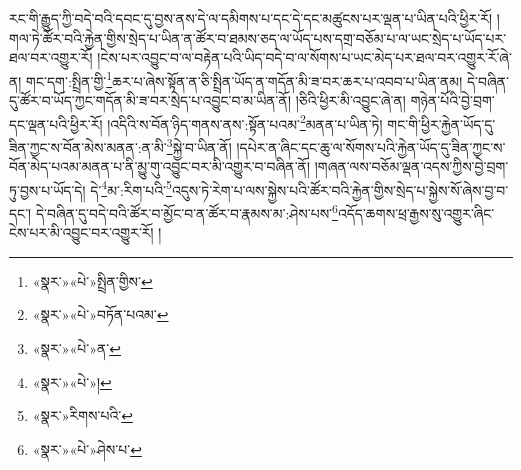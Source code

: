 རང་གི་རྒྱུད་ཀྱི་བདེ་བའི་དབང་དུ་བྱས་ནས་དེ་ལ་དམིགས་པ་དང་དེ་དང་མཚུངས་པར་ལྡན་པ་ཡིན་པའི་ཕྱིར་རོ། །གལ་ཏེ་ཚོར་བའི་རྐྱེན་གྱིས་སྲེད་པ་ཡིན་ན་ཚོར་བ་ཐམས་ཅད་ལ་ཡོད་པས་དགྲ་བཅོམ་པ་ལ་ཡང་སྲེད་པ་ཡོད་པར་ཐལ་བར་འགྱུར་རོ། །ངེས་པར་འབྱུང་བ་ལ་བརྟེན་པའི་ཡིད་བདེ་བ་ལ་སོགས་པ་ཡང་མེད་པར་ཐལ་བར་འགྱུར་རོ་ཞེ་ན། གང་དག་:སྤྲིན་གྱི་\footnote{«སྣར་»«པེ་»སྤྲིན་གྱིས་}ཆར་པ་ཞེས་སྟོན་ན་ཅི་སྤྲིན་ཡོད་ན་གདོན་མི་ཟ་བར་ཆར་པ་འབབ་པ་ཡིན་ནམ། དེ་བཞིན་དུ་ཚོར་བ་ཡོད་ཀྱང་གདོན་མི་ཟ་བར་སྲེད་པ་འབྱུང་བ་མ་ཡིན་ནོ། །ཅིའི་ཕྱིར་མི་འབྱུང་ཞེ་ན། གཉེན་པོའི་བྱེ་བྲག་དང་ལྡན་པའི་ཕྱིར་རོ། །འདིའི་ས་བོན་ཉིད་གནས་ནས་:སྟོན་པའམ་\footnote{«སྣར་»«པེ་»བཏོན་པའམ་}མནན་པ་ཡིན་ཏེ། གང་གི་ཕྱིར་རྐྱེན་ཡོད་དུ་ཟིན་ཀྱང་ས་བོན་མེས་མནན་:ན་མི་\footnote{«སྣར་»«པེ་»ན་}སྐྱེ་བ་ཡིན་ནོ། །དཔེར་ན་ཞིང་དང་ཆུ་ལ་སོགས་པའི་རྐྱེན་ཡོད་དུ་ཟིན་ཀྱང་ས་བོན་མེད་པའམ་མནན་པ་ནི་མྱུ་གུ་འབྱུང་བར་མི་འགྱུར་བ་བཞིན་ནོ། །གཞན་ལས་བཅོམ་ལྡན་འདས་ཀྱིས་བྱེ་བྲག་ཏུ་བྱས་པ་ཡོད་དེ། དེ་\footnote{«སྣར་»«པེ་»།}མ་:རིག་པའི་\footnote{«སྣར་»རིགས་པའི་}འདུས་ཏེ་རེག་པ་ལས་སྐྱེས་པའི་ཚོར་བའི་རྐྱེན་གྱིས་སྲེད་པ་སྐྱེས་སོ་ཞེས་བྱ་བ་དང་། དེ་བཞིན་དུ་བདེ་བའི་ཚོར་བ་མྱོང་བ་ན་ཚོར་བ་རྣམས་མ་:ཤེས་པས་\footnote{«སྣར་»«པེ་»ཤེས་པ་}འདོད་ཆགས་ཕྲ་རྒྱས་སུ་འགྱུར་ཞིང་ངེས་པར་མི་འབྱུང་བར་འགྱུར་རོ། །
